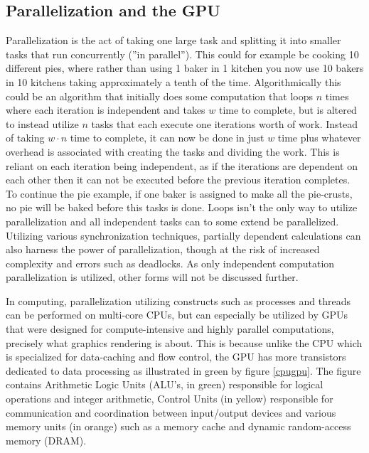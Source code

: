 
\subsection{Parallelization and the GPU}
Parallelization is the act of taking one large task and splitting it into smaller tasks that run concurrently (''in parallel'').
This could for example be cooking 10 different pies, where rather than using 1 baker in 1 kitchen you now use 10 bakers in 10 kitchens taking approximately a tenth of the time.
Algorithmically this could be an algorithm that initially does some computation that loops $n$ times where each iteration is independent and takes $w$ time to complete, but is altered to instead utilize $n$ tasks that each execute one iterations worth of work.
Instead of taking $w \cdot n$ time to complete, it can now be done in just $w$ time plus whatever overhead is associated with creating the tasks and dividing the work.
This is reliant on each iteration being independent, as if the iterations are dependent on each other then it can not be executed before the previous iteration completes.
To continue the pie example, if one baker is assigned to make all the pie-crusts, no pie will be baked before this tasks is done.
Loops isn't the only way to utilize parallelization and all independent tasks can to some extend be parallelized. 
Utilizing various synchronization techniques, partially dependent calculations can also harness the power of parallelization, though at the risk of increased complexity and errors such as deadlocks.
As only independent computation parallelization is utilized, other forms will not be discussed further.

In computing, parallelization utilizing constructs such as processes and threads can be performed on multi-core CPUs, but can especially be utilized by GPUs that were designed for compute-intensive and highly parallel computations, precisely what graphics rendering is about.
This is because unlike the CPU which is specialized for data-caching and flow control, the GPU has more transistors dedicated to data processing as illustrated in green by figure \ref{cpugpu}. 
The figure contains Arithmetic Logic Units (ALU's, in green) responsible for logical operations and integer arithmetic, Control Units (in yellow) responsible for communication and coordination between input/output devices and various memory units (in orange) such as a memory cache and dynamic random-access memory (DRAM).

